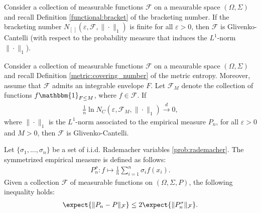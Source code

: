     \begin{property}
        Consider a collection of measurable functions $\mathcal{F}$ on a meaurable space $(\Omega,\Sigma)$ and recall Definition \ref{functional:bracket} of the bracketing number. If the bracketing number $N_{[\,]}(\varepsilon,\mathcal{F},\|\cdot\|_1)$ is finite for all $\varepsilon>0$, then $\mathcal{F}$ is Glivenko-Cantelli (with respect to the probability measure that induces the $L^1$-norm $\|\cdot\|_1$).
    \end{property}
    \begin{property}\label{statistics:entrop_GC}
        Consider a collection of measurable functions $\mathcal{F}$ on a meaurable space $(\Omega,\Sigma)$ and recall Definition \ref{metric:covering_number} of the metric entropy. Moreover, assume that $\mathcal{F}$ admits an integrable envelope $F$. Let $\mathcal{F}_M$ denote the collection of functions $f\mathbbm{1}_{F\leq M}$, where $f\in\mathcal{F}$. If
        \begin{gather}
            \frac{1}{n}\ln N_C(\varepsilon,\mathcal{F}_M,\|\cdot\|_1)\overset{d}{\longrightarrow}0,
        \end{gather}
        where $\|\cdot\|_1$ is the $L^1$-norm associated to the empirical measure $P_n$, for all $\varepsilon>0$ and $M>0$, then $\mathcal{F}$ is Glivenko-Cantelli.
    \end{property}

    \begin{property}
        Let $\{\sigma_1,\ldots,\sigma_n\}$ be a set of i.i.d. Rademacher variables \ref{prob:rademacher}. The symmetrized empirical measure is defined as follows:
        \begin{gather}
            P^\sigma_n:f\mapsto\frac{1}{n}\sum_{i=1}^n\sigma_if(x_i).
        \end{gather}
        Given a collection $\mathcal{F}$ of measurable functions on $(\Omega,\Sigma,P)$, the following inequality holds:
        \begin{gather}
            \expect{\|P_n-P\|_\mathcal{F}}\leq2\expect{\|P^\sigma_n\|_\mathcal{F}}.
        \end{gather}
    \end{property}

